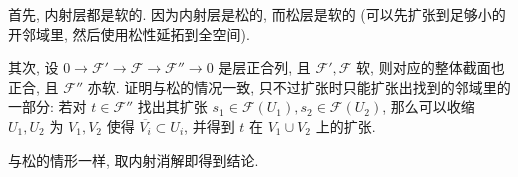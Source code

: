 \documentclass{article}
\theoremstyle{exercise}
\theoremstyle{plain}
\theoremstyle{remark}
\newenvironment{proofc}{\proof}{\endproof}
\def\sF{\mathscr{F}}
\begin{document}
\begin{proofc}
  首先, 内射层都是软的. 因为内射层是松的, 而松层是软的
  (可以先扩张到足够小的开邻域里, 然后使用松性延拓到全空间).

  其次, 设 $0 \to \sF' \to \sF \to \sF'' \to 0$ 是层正合列,
  且 $\sF', \sF$ 软, 则对应的整体截面也正合, 且 $\sF''$ 亦软.
  证明与松的情况一致, 只不过扩张时只能扩张出找到的邻域里的一部分:
  若对 $t \in \sF''$ 找出其扩张 $s_1 \in \sF(U_1), s_2 \in \sF(U_2)$,
  那么可以收缩 $U_1, U_2$ 为 $V_1, V_2$ 使得 $\overline{V_i} \subset U_i$,
  并得到 $t$ 在 $V_1 \cup V_2$ 上的扩张.

  与松的情形一样, 取内射消解即得到结论.
\end{proofc}
\end{document}

